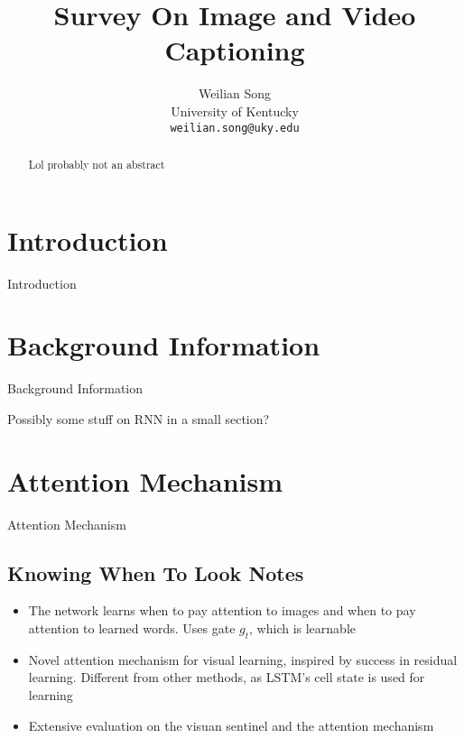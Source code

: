 \documentclass[10pt,twocolumn,letterpaper]{article}
\begin{document}
\title{Survey On Image and Video Captioning}

\author{Weilian Song\\
University of Kentucky\\
{\tt\small weilian.song@uky.edu}
}

\maketitle

\begin{abstract}
  Lol probably not an abstract
\end{abstract}

\section{Introduction}

Introduction

\section{Background Information}

Background Information

Possibly some stuff on RNN in a small section?

\section{Attention Mechanism}

Attention Mechanism

\subsection{Knowing When To Look Notes}

\begin{itemize}
\item The network learns when to pay attention to images and when to pay attention
      to learned words. Uses gate $g_t$, which is learnable
\item Novel attention mechanism for visual learning, inspired by success in
      residual learning. Different from other methods, as LSTM's cell state is
      used for learning
\item Extensive evaluation on the visuan sentinel and the attention mechanism
\end{itemize}
\end{document}
